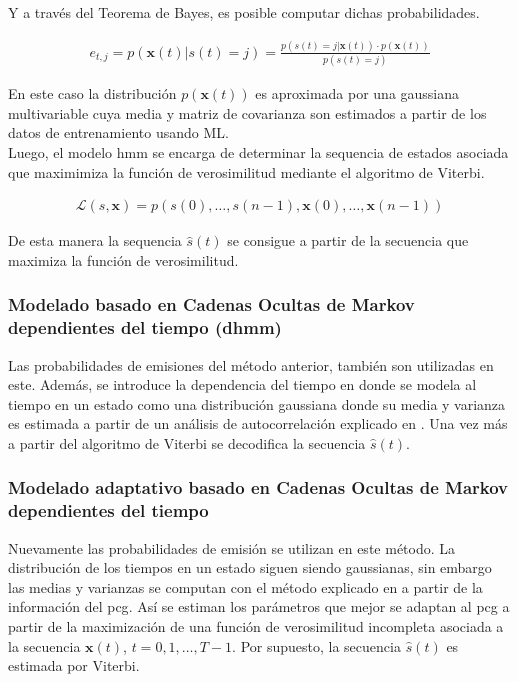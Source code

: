 \indent Y a través del Teorema de Bayes, es posible computar dichas probabilidades.

\begin{align}
  e_{t,j} = p(\mathbf{x}(t)|s(t)=j) = \frac{p(s(t) = j|\mathbf{x}(t)) \cdot p(\mathbf{x}(t))}{p(s(t) = j)}
\end{align}

\indent En este caso la distribución $p(\mathbf{x}(t))$ es aproximada por una gaussiana multivariable cuya media y
matriz de covarianza son estimados a partir de los datos de entrenamiento usando ML. \\
\indent Luego, el modelo \gls{hmm} se encarga de determinar la sequencia de estados asociada que maximimiza la
función de verosimilitud mediante el algoritmo de Viterbi.

\begin{align}
  \mathcal{L}(s,\mathbf{x}) = p(s(0),\dots,s(n-1),\mathbf{x}(0),\dots,\mathbf{x}(n-1))
\end{align}

\indent De esta manera la sequencia $\hat{s}(t)$ se consigue a partir de la secuencia que maximiza la función de
verosimilitud.

\subsubsection*{Modelado basado en Cadenas Ocultas de Markov dependientes del tiempo (\gls{dhmm})}

\indent Las probabilidades de emisiones del método anterior, también son utilizadas en este. Además, se introduce la
dependencia del tiempo en donde se modela al tiempo en un estado como una distribución gaussiana donde su media y
varianza es estimada a partir de un análisis de autocorrelación explicado en \cite{pp:schmidt2010}. Una vez más a
partir del algoritmo de Viterbi se decodifica la secuencia $\hat{s}(t)$.

\subsubsection*{Modelado adaptativo basado en Cadenas Ocultas de Markov dependientes del tiempo}

\indent Nuevamente las probabilidades de emisión se utilizan en este método. La distribución de los tiempos en un
estado siguen siendo gaussianas, sin embargo las medias y varianzas se computan con el método explicado en
\cite{pp:oliveira-renna-coimbra} a partir de la información del \gls{pcg}. Así se estiman los parámetros que
mejor se adaptan al \gls{pcg} a partir de la maximización de una función de verosimilitud incompleta asociada a
la secuencia $\mathbf{x}(t)$, $t=0,1,\dots,T-1$. Por supuesto, la secuencia $\hat{s}(t)$ es estimada por Viterbi.
